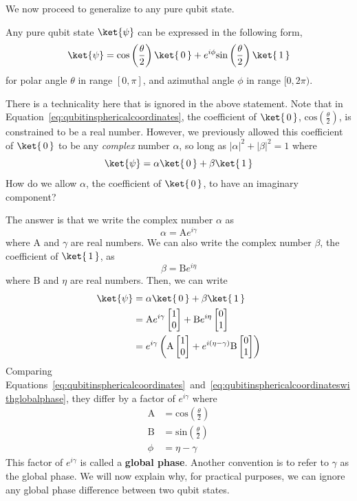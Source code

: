 \documentclass{article}
\theoremstyle{definition}
\newcommand{\abs}[1]{{\big\vert} #1 {\big\vert}}
\newcommand{\kz}[1]{\ket{\,#1\,}}
\newcommand{\mkzero}{\begin{bmatrix}1\\ 0\end{bmatrix}}
\newcommand{\mkone}{\begin{bmatrix}0\\ 1\end{bmatrix}}
\begin{document}
We now proceed to generalize to any pure qubit state.

Any pure qubit state $\ket{\psi}$ can be expressed in the following form,
\begin{equation}
	\ket{\psi} = \text{cos}\left(\frac{\theta}{2}\right) \kz0 + e^{i \phi} \text{sin}\left(\frac{\theta}{2}\right) \kz1
	\label{eq:qubitinsphericalcoordinates}
\end{equation}
for polar angle $\theta$ in range $[0,\pi]$, and azimuthal angle $\phi$ in range $[0,2\pi)$.

There is a technicality here that is ignored in the above statement.  Note that in Equation~\ref{eq:qubitinsphericalcoordinates}, the coefficient of $\kz0$, $\text{cos}\left(\frac{\theta}{2}\right)$, is constrained to be a real number.  However, we previously allowed this coefficient of $\kz0$ to be any \textit{complex} number $\alpha$, so long as $\abs{\alpha}^2 + \abs{\beta}^2 = 1$ where
\begin{equation}
	\ket{\psi} = \alpha \kz0 + \beta \kz1
\end{equation}
How do we allow $\alpha$, the coefficient of $\kz0$, to have an imaginary component?

The answer is that we write the complex number $\alpha$ as
\begin{equation}
	\alpha = \mathrm{A} e^{i \gamma}
\end{equation}
where $\mathrm{A}$ and $\gamma$ are real numbers.
We can also write the complex number $\beta$, the coefficient of $\kz1$, as
\begin{equation}
	\beta = \mathrm{B} e^{i \eta}
\end{equation}
where $\mathrm{B}$ and $\eta$ are real numbers.
Then, we can write
\begin{align}
	\ket{\psi} &= \alpha \kz0 + \beta \kz1\\
	&= \mathrm{A} e^{i \gamma} \mkzero + \mathrm{B} e^{i \eta} \mkone\\
	&= e^{i \gamma} \left( \mathrm{A} \mkzero + e^{i (\eta - \gamma)} \mathrm{B} \mkone \right)
	\label{eq:qubitinsphericalcoordinateswithglobalphase}
\end{align}
Comparing Equations~\ref{eq:qubitinsphericalcoordinates}~and~\ref{eq:qubitinsphericalcoordinateswithglobalphase}, they differ by a factor of $e^{i \gamma}$ where
\begin{align}
	\mathrm{A} &= \text{cos}\left(\frac{\theta}{2}\right)\\
	\mathrm{B} &= \text{sin}\left(\frac{\theta}{2}\right)\\
	\phi &= \eta - \gamma
\end{align}
This factor of $e^{i \gamma}$ is called a \textbf{global phase}.  Another convention is to refer to $\gamma$ as the global phase.
We will now explain why, for practical purposes, we can ignore any global phase difference between two qubit states.
\end{document}
